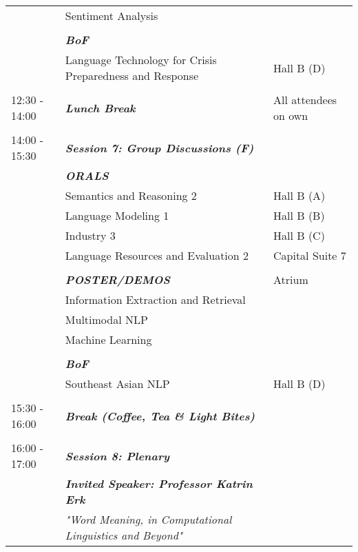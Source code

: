 \begin{longtable}{p{15mm}p{60mm}p{30mm}}
& Sentiment Analysis & \\\\
& \emph{\textbf{BoF}} & \\
& Language Technology for Crisis Preparedness and Response & Hall B (D) \\\\
{12:30 - 14:00} & \emph{\textbf{Lunch Break}} & All attendees on own \\\\
{14:00 - 15:30} & \emph{\textbf{Session 7: Group Discussions (F)}} & \\
& \emph{\textbf{ORALS}} & \\
& Semantics and Reasoning 2 & Hall B (A) \\
& Language Modeling 1 & Hall B (B) \\
& Industry 3 & Hall B (C) \\
& Language Resources and Evaluation 2 & Capital Suite 7 \\\\
& \emph{\textbf{POSTER/DEMOS}} & Atrium \\
& Information Extraction and Retrieval & \\
& Multimodal NLP & \\
& Machine Learning & \\\\
& \emph{\textbf{BoF}} & \\
& Southeast Asian NLP & Hall B (D) \\\\
{15:30 - 16:00} & \emph{\textbf{Break (Coffee, Tea \& Light Bites)}} & \\\\
{16:00 - 17:00} & \emph{\textbf{Session 8: Plenary}} & \\
& \emph{\textbf{Invited Speaker: Professor Katrin Erk}} & \\
& \emph{"Word Meaning, in Computational Linguistics and Beyond"} & \\
\end{longtable}

